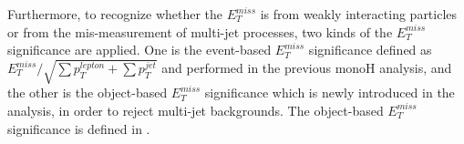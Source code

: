 \documentclass[class=NTHU_thesis, crop=false]{standalone}
\begin{document}
Furthermore, to recognize whether the $E^{miss}_T$ is from weakly interacting particles or from the mis-measurement of multi-jet processes, two kinds of the $E^{miss}_T$ significance are applied. One is the event-based $E^{miss}_T$ significance defined as $E^{miss}_T/\sqrt{{\sum}p^{lepton}_T+{\sum}p^{jet}_T}$ and performed in the previous monoH analysis\cite{Meehan:2225941}, and the other is the object-based $E^{miss}_T$ significance which is newly introduced in the analysis, in order to reject multi-jet backgrounds. The object-based $E^{miss}_T$ significance is defined in \cite{ATLAS-CONF-2018-038}.
\end{document}

